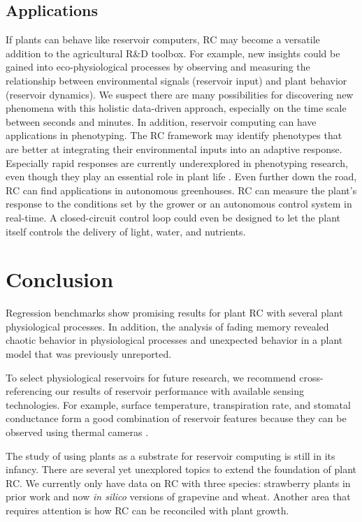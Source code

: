 \documentclass[10pt,a4paper,journal]{IEEEtran}
\begin{document}
\subsection{Applications}
If plants can behave like reservoir computers, RC may become a versatile addition to the agricultural R\&D toolbox.
For example, new insights could be gained into eco-physiological processes by observing and measuring the relationship between environmental signals (reservoir input) and plant behavior (reservoir dynamics).
We suspect there are many possibilities for discovering new phenomena with this holistic data-driven approach, especially on the time scale between seconds and minutes.
In addition, reservoir computing can have applications in phenotyping. 
The RC framework may identify phenotypes that are better at integrating their environmental inputs into an adaptive response.
Especially rapid responses are currently underexplored in phenotyping research, even though they play an essential role in plant life \cite{alarcon_substantial_1994, de_swaef_plant_2015}.
Even further down the road, RC can find applications in autonomous greenhouses. RC can measure the plant's response to the conditions set by the grower or an autonomous control system in real-time. 
A closed-circuit control loop could even be designed to let the plant itself controls the delivery of light, water, and nutrients.


\section{Conclusion}

Regression benchmarks show promising results for plant RC with several plant physiological processes.
In addition, the analysis of fading memory revealed chaotic behavior in physiological processes and unexpected behavior in a plant model that was previously unreported.

To select physiological reservoirs for future research, we recommend cross-referencing our results of reservoir performance with available sensing technologies.
For example, surface temperature, transpiration rate, and stomatal conductance form a good combination of reservoir features because they can be observed using thermal cameras \cite{pieters_reservoir_2022}.

The study of using plants as a substrate for reservoir computing is still in its infancy.
There are several yet unexplored topics to extend the foundation of plant RC.
We currently only have data on RC with three species: strawberry plants in prior work and now \textit{in silico} versions of grapevine and wheat.
Another area that requires attention is how RC can be reconciled with plant growth.
\end{document}
